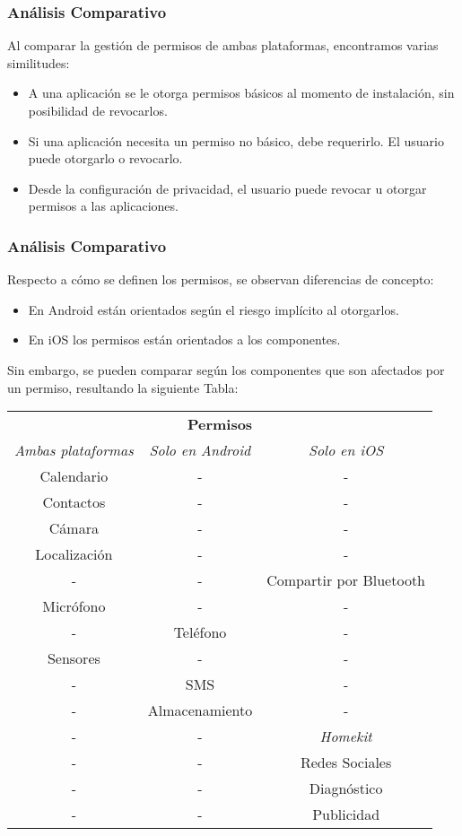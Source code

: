 \begin{frame}
 \frametitle{Análisis Comparativo}
Al comparar la gestión de permisos de ambas plataformas, encontramos varias similitudes:\pause
 \begin{itemize}[<+->]
  \item A una aplicación se le otorga permisos básicos al momento de instalación, sin posibilidad de revocarlos.
  \item Si una aplicación necesita un permiso no básico, debe requerirlo. El usuario puede otorgarlo o revocarlo.
  \item Desde la configuración de privacidad, el usuario puede revocar u otorgar permisos a las aplicaciones.
 \end{itemize}
\end{frame}
\begin{frame}
 \frametitle{Análisis Comparativo}
Respecto a cómo se definen los permisos, se observan diferencias de concepto:\\ \pause
 \begin{itemize}[<+->]
  \item En Android están orientados según el riesgo implícito al otorgarlos.
  \item En iOS los permisos están orientados a los componentes.
 \end{itemize} \pause
 
Sin embargo, se pueden comparar según los componentes que son afectados por un permiso, \pause resultando la siguiente Tabla:
  \begin{table}[H]
    \centering
    \begin{tiny}
	\begin{tabular}{c c c}
		\hline
		\multicolumn{3}{c}{\textbf{Permisos}} \\
		\emph{Ambas plataformas} 	& \emph{Solo en Android}	& \emph{Solo en iOS} \\ \hline    \hline
		Calendario	& -		& -	\\						
		Contactos	& -				& - \\						
		Cámara		& -				& -	\\						
		Localización& -				& -	\\						
		-			& -				& Compartir por Bluetooth\\ 
		Micrófono   & -				& - \\						
		-			& Teléfono		& -	\\						
		Sensores    & -    			& - \\						
		-			& SMS			& - \\						
		-			& Almacenamiento& - \\						
		-			& -				& \emph{Homekit} \\			
		-			& -				& Redes Sociales \\        	
		-			& -				& Diagnóstico \\        			
		-			& -				& Publicidad \\    			\hline
	\end{tabular}
	\end{tiny}
   \end{table}
\end{frame}
